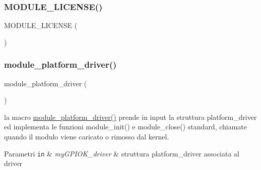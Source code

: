 \subsubsection{\texorpdfstring{M\+O\+D\+U\+L\+E\+\_\+\+L\+I\+C\+E\+N\+S\+E()}{MODULE\_LICENSE()}}
{\footnotesize\ttfamily M\+O\+D\+U\+L\+E\+\_\+\+L\+I\+C\+E\+N\+SE (\begin{DoxyParamCaption}\item[{\char`\"{}G\+PL\char`\"{}}]{ }\end{DoxyParamCaption})}

\mbox{\label{group___linux-_driver_ga61e890be90fe5582db8048893ca0ebbf}} 
\subsubsection{\texorpdfstring{module\+\_\+platform\+\_\+driver()}{module\_platform\_driver()}}
{\footnotesize\ttfamily module\+\_\+platform\+\_\+driver (\begin{DoxyParamCaption}\item[{\hyperlink{group___linux-_driver_ga8dba1541b58fa63f8208232ffce4fc47}{my\+G\+P\+I\+O\+K\+\_\+driver}}]{ }\end{DoxyParamCaption})}



la macro \hyperlink{group___linux-_driver_ga61e890be90fe5582db8048893ca0ebbf}{module\+\_\+platform\+\_\+driver()} prende in input la struttura platform\+\_\+driver ed implementa le funzioni module\+\_\+init() e module\+\_\+close() standard, chiamate quando il modulo viene caricato o rimosso dal kernel. 


\begin{DoxyParams}[1]{Parametri}
\mbox{\tt in}  & {\em my\+G\+P\+I\+O\+K\+\_\+driver} & struttura platform\+\_\+driver associata al driver \\
\hline
\end{DoxyParams}
\mbox{\label{group___linux-_driver_ga4d0a47b4ff404d7ced2610438ec9802e}} 
